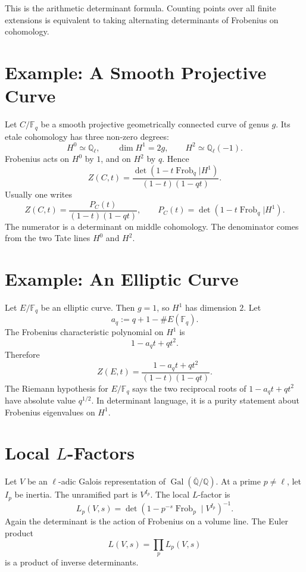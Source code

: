 \documentclass[11pt]{memoir}
\newcommand{\Frob}{\operatorname{Frob}}
\newcommand{\bF}{\mathbb{F}}
\newcommand{\bQ}{\mathbb{Q}}
\begin{document}
This is the arithmetic determinant formula. Counting points over all
finite extensions is equivalent to taking alternating determinants of
Frobenius on cohomology.

\section{Example: A Smooth Projective Curve}
\label{sec:curve-zeta}

Let \(C/\bF_q\) be a smooth projective geometrically connected curve
of genus \(g\). Its etale cohomology has three non-zero degrees:
\[
  H^0\simeq \bQ_\ell,\qquad
  \dim H^1=2g,\qquad
  H^2\simeq \bQ_\ell(-1).
\]
Frobenius acts on \(H^0\) by \(1\), and on \(H^2\) by \(q\). Hence
\[
  Z(C,t)
  =
  \frac{\det(1-t\Frob_q|H^1)}
  {(1-t)(1-qt)}.
\]
Usually one writes
\[
  Z(C,t)=\frac{P_C(t)}{(1-t)(1-qt)},
\qquad
  P_C(t)=\det(1-t\Frob_q|H^1).
\]
The numerator is a determinant on middle cohomology. The denominator
comes from the two Tate lines \(H^0\) and \(H^2\).

\section{Example: An Elliptic Curve}
\label{sec:elliptic-zeta}

Let \(E/\bF_q\) be an elliptic curve. Then \(g=1\), so \(H^1\) has
dimension \(2\). Let
\[
  a_q:=q+1-\#E(\bF_q).
\]
The Frobenius characteristic polynomial on \(H^1\) is
\[
  1-a_qt+qt^2.
\]
Therefore
\[
  Z(E,t)=\frac{1-a_qt+qt^2}{(1-t)(1-qt)}.
\]
The Riemann hypothesis for \(E/\bF_q\) says the two reciprocal roots
of \(1-a_qt+qt^2\) have absolute value \(q^{1/2}\). In determinant
language, it is a purity statement about Frobenius eigenvalues on
\(H^1\).

\section{\texorpdfstring{Local \(L\)-Factors}{Local L-Factors}}
\label{sec:local-l-factors}

Let \(V\) be an \(\ell\)-adic Galois representation of
\(\operatorname{Gal}(\overline{\bQ}/\bQ)\). At a prime \(p\neq \ell\),
let \(I_p\) be inertia. The unramified part is \(V^{I_p}\). The local
\(L\)-factor is
\[
  L_p(V,s)
  =
  \det\left(1-p^{-s}\Frob_p\mid V^{I_p}\right)^{-1}.
\]
Again the determinant is the action of Frobenius on a volume line.
The Euler product
\[
  L(V,s)=\prod_pL_p(V,s)
\]
is a product of inverse determinants.
\end{document}
